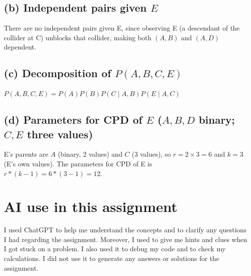 \documentclass[11pt]{article}
\begin{document}
\subsection*{(b) Independent pairs given $E$}
There are no independent pairs given E, since observing E (a descendant of the collider at C) unblocks that collider, making both $(A,B)$ and $(A,D)$ dependent.

\subsection*{(c) Decomposition of $P(A,B,C,E)$}
$P(A,B,C,E) = P(A)P(B)P(C \mid A,B)P(E \mid A,C)$

\subsection*{(d) Parameters for CPD of $E$ ($A,B,D$ binary; $C,E$ three values)}
E's parents are $A$ (binary, 2 values) and $C$ (3 values), so $r = 2 \times 3 = 6$ and $k = 3$ (E's own values).
The parameters for CPD of E is $r*(k-1) = 6*(3-1) = 12$.

\section*{AI use in this assignment}
I used ChatGPT to help me understand the concepts and to clarify any questions I had regarding the assignment. Moreover, I used to give me hints and clues when I got stuck on a problem. I also used it to debug my code and to check my calculations. I did not use it to generate any answers or solutions for the assignment.
\end{document}
